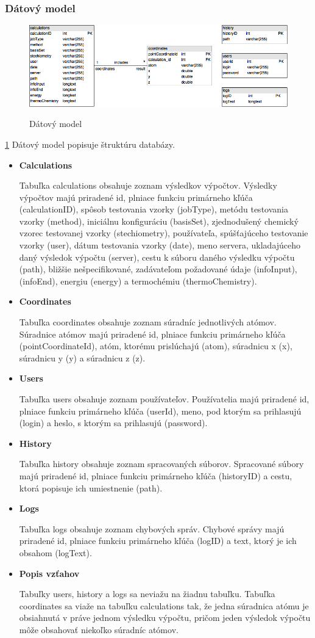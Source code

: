 \documentclass[12pt,a4paper]{article}
\begin{document}
\subsubsection{Dátový model}
\begin{figure}[H]
	\caption{Dátový model}
	\includegraphics[width=\textwidth]{datovy_model}
	\label{fig:datovy_model}
\end{figure}
\ref{fig:datovy_model}
Dátový model popisuje štruktúru databázy.
\begin{itemize}
	\item{\bf Calculations} \par
	Tabuľka calculations obsahuje zoznam výsledkov výpočtov. Výsledky výpočtov majú priradené id, plniace funkciu primárneho kľúča (calculationID), spôsob testovania vzorky (jobType), metódu testovania vzorky (method), iniciálnu konfiguráciu (basisSet), zjednodušený chemický vzorec testovanej vzorky (stechiometry), používateľa, spúšťajúceho testovanie vzorky (user), dátum testovania vzorky (date), meno servera, ukladajúceho daný výsledok výpočtu (server), cestu k súboru daného výsledku výpočtu (path), bližšie nešpecifikované, zadávateľom požadované údaje (infoInput), (infoEnd), energiu (energy) a termochémiu (thermoChemistry).
	\item{\bf Coordinates} \par
	Tabuľka coordinates obsahuje zoznam súradníc jednotlivých atómov. Súradnice atómov majú priradené id, plniace funkciu primárneho kľúča (pointCoordinateId), atóm, ktorému prislúchajú (atom), súradnicu x (x), súradnicu y (y) a súradnicu z (z).
	\item{\bf Users} \par
	Tabuľka users obsahuje zoznam používateľov. Používatelia majú priradené id, plniace funkciu primárneho kľúča (userId), meno, pod ktorým sa prihlasujú (login) a heslo, s ktorým sa prihlasujú (password).
	\item{\bf History} \par
	Tabuľka history obsahuje zoznam spracovaných súborov. Spracované súbory majú priradené id, plniace funkciu primárneho kľúča (historyID) a cestu, ktorá popisuje ich umiestnenie (path).
	\item{\bf Logs} \par
	Tabuľka logs obsahuje zoznam chybových správ. Chybové správy majú priradené id, plniace funkciu primárneho kľúča (logID) a text, ktorý je ich obsahom (logText).
	\item{\bf Popis vzťahov} \par
	Tabuľky users, history a logs sa neviažu na žiadnu tabuľku. Tabuľka coordinates sa viaže na tabuľku calculations tak, že jedna súradnica atómu je obsiahnutá v práve jednom výsledku výpočtu, pričom jeden výsledok výpočtu môže obsahovať niekoľko súradníc atómov.
\end{itemize}
\end{document}
